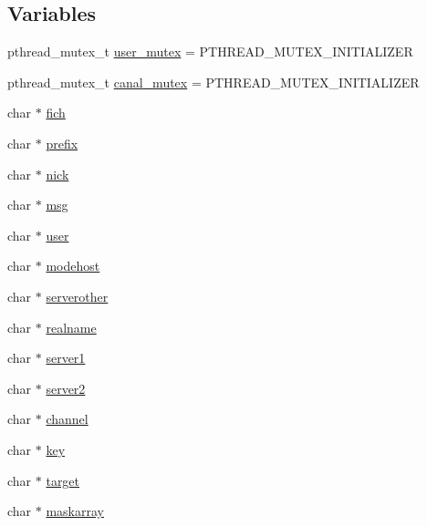 \subsection*{Variables}
\begin{DoxyCompactItemize}
\item 
pthread\+\_\+mutex\+\_\+t \hyperlink{_g-2361-06-_p1-_server_8c_a5dedd07a1144d2ab70b74a8e64b6a7c0}{user\+\_\+mutex} = P\+T\+H\+R\+E\+A\+D\+\_\+\+M\+U\+T\+E\+X\+\_\+\+I\+N\+I\+T\+I\+A\+L\+I\+Z\+ER
\item 
pthread\+\_\+mutex\+\_\+t \hyperlink{_g-2361-06-_p1-_server_8c_ab86a544a49de18195048bac54dd3ac3e}{canal\+\_\+mutex} = P\+T\+H\+R\+E\+A\+D\+\_\+\+M\+U\+T\+E\+X\+\_\+\+I\+N\+I\+T\+I\+A\+L\+I\+Z\+ER
\item 
char $\ast$ \hyperlink{_g-2361-06-_p1-_server_8c_a5666511ca3d4a3dc685c6f14c663aed5}{fich}
\item 
char $\ast$ \hyperlink{_g-2361-06-_p1-_server_8c_ad2849cf781a4db22cc1b31eaaee50a4f}{prefix}
\item 
char $\ast$ \hyperlink{_g-2361-06-_p1-_server_8c_a89f27568c92a418413e6b37b41f07e21}{nick}
\item 
char $\ast$ \hyperlink{_g-2361-06-_p1-_server_8c_a32d2f5216cddb59c7cc8fb2806a7e727}{msg}
\item 
char $\ast$ \hyperlink{_g-2361-06-_p1-_server_8c_a14871705f45ccdc5bb9f4549efd8e119}{user}
\item 
char $\ast$ \hyperlink{_g-2361-06-_p1-_server_8c_a4f28f55d19ac069eabc38c224c3a4225}{modehost}
\item 
char $\ast$ \hyperlink{_g-2361-06-_p1-_server_8c_ae6eaaf28b08889a7ec2359f8968d796c}{serverother}
\item 
char $\ast$ \hyperlink{_g-2361-06-_p1-_server_8c_a980ab011cd3d327b370c042833f1dc08}{realname}
\item 
char $\ast$ \hyperlink{_g-2361-06-_p1-_server_8c_a9045e9ee0087b60273244cd6c2f91a5f}{server1}
\item 
char $\ast$ \hyperlink{_g-2361-06-_p1-_server_8c_a70dd311bef3d0b4160a7ce0706f8f4cc}{server2}
\item 
char $\ast$ \hyperlink{_g-2361-06-_p1-_server_8c_a842ca2f026578e5c479c095ff3335969}{channel}
\item 
char $\ast$ \hyperlink{_g-2361-06-_p1-_server_8c_a5892a9181e6a332f84d27aecd41dcd12}{key}
\item 
char $\ast$ \hyperlink{_g-2361-06-_p1-_server_8c_a23b26cdb3a71f525caf03b57f68d47fa}{target}
\item 
char $\ast$ \hyperlink{_g-2361-06-_p1-_server_8c_ad51a4303b7c769561b12bf04a68bc042}{maskarray}

\end{DoxyCompactItemize}
